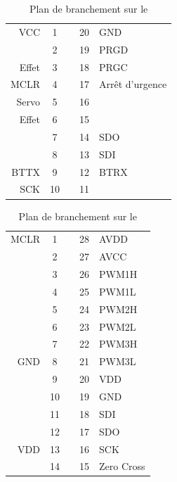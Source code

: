 		\begin{table}[hb]
			\begin{multicols}{2}
			\begin{center}
			
			
			\begin{footnotesize}
			\begin{tabular}{r|ccc|l}
				VCC		& 1 &   & 20 & GND \\ 
				  		& 2 &   & 19 & PRGD \\ 
				Effet	& 3 &   & 18 & PRGC \\ 
				MCLR 	& 4 &   & 17 & Arrêt d'urgence \\ 
				Servo 	& 5 &   & 16 &   \\
				 Effet	& 6 &   & 15 &   \\ 
				  		& 7 &   & 14 & SDO \\ 
				  		& 8 &   & 13 & SDI \\ 
				BTTX 	& 9 &   & 12 & BTRX \\ 
				SCK 	& 10&   & 11 &   \\ 
				\end{tabular} 
			\end{footnotesize}
				
			
			\caption{Plan de branchement sur le \pic}
			\label{pinoutpic}
		
			
			\begin{footnotesize}
				\begin{tabular}{r|ccc|l}
				MCLR 	& 1 &    & 28 & AVDD 	\\ 
				  		& 2 &    & 27 & AVCC 	\\ 
				  		& 3 &    & 26 & PWM1H	\\
				  		& 4 &    & 25 & PWM1L	\\ 
				  		& 5 &    & 24 & PWM2H	\\ 
				  		& 6 &    & 23 & PWM2L  	\\ 
				 		& 7 &    & 22 & PWM3H  	\\ 
				GND 	& 8 &    & 21 & PWM3L  	\\ 
				  		& 9 &    & 20 & VDD 	\\ 
				  		& 10 &   & 19 & GND 	\\ 
				  		& 11 &   & 18 & SDI 	\\ 
				  		& 12 &   & 17 & SDO 	\\ 
				VDD 	& 13 &   & 16 & SCK 	\\ 
				  		& 14 &   & 15 & Zero Cross\\ 
				\end{tabular} 
			\end{footnotesize}
			\caption{Plan de branchement sur le \dspic}
			\label{pinoutdspic}
			\end{center}
			\end{multicols}
		\end{table}

